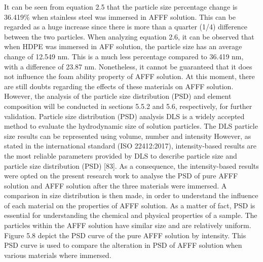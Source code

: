 \documentclass[12pt]{report}
\begin{document}
It can be seen from equation 2.5 that the particle size percentage change is 36.419\% when stainless steel was immersed in AFFF solution. This can be regarded as a huge increase since there is more than a quarter (1/4) difference between the two particles. When analyzing equation 2.6, it can be observed that when HDPE was immersed in AFF solution, the particle size has an average change of 12.549 nm. This is a much less percentage compared to 36.419 nm, with a difference of 23.87 nm. Nonetheless, it cannot be guaranteed that it does not influence the foam ability property of AFFF solution.  At this moment, there are still doubts regarding the effects of these materials on AFFF solution. However, the analysis of the particle size distribution (PSD) and element composition will be conducted in sections 5.5.2 and 5.6, respectively, for further validation.
Particle size distribution (PSD) analysis 
DLS is a widely accepted method to evaluate the hydrodynamic size of solution particles. The DLS particle size results can be represented using volume, number and intensity However, as stated in the international standard (ISO 22412:2017), intensity-based results are the most reliable parameters provided by DLS to describe particle size and particle size distribution (PSD) [83]. As a consequence, the intensity-based results were opted on the present research work to analyse the PSD of pure AFFF solution and AFFF solution after the three materials were immersed. A comparison in size distribution is then made, in order to understand the influence of each material on the properties of AFFF solution. As a matter of fact, PSD is essential for understanding the chemical and physical properties of a sample. The particles within the AFFF solution have similar size and are relatively uniform. Figure 5.8 depict the PSD curve of the pure AFFF solution by intensity. This PSD curve is used to compare the alteration in PSD of AFFF solution when various materials where immersed. 

\end{document}
